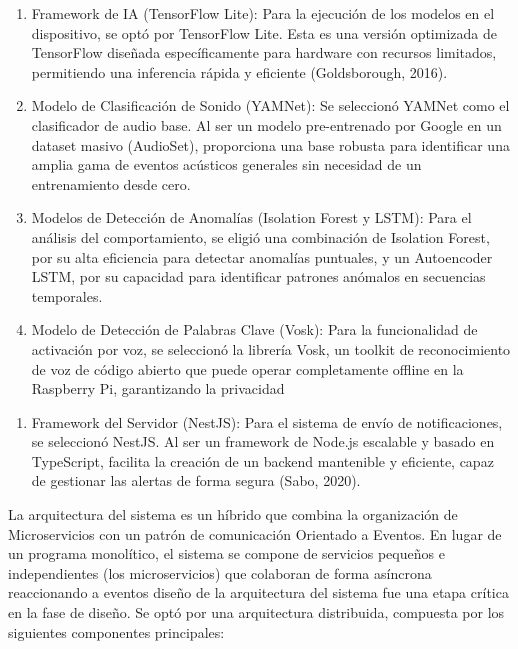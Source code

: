 
\begin{enumerate}
      \item Framework de IA (TensorFlow Lite): Para la ejecución de los modelos en el dispositivo, se optó por TensorFlow Lite. Esta es una versión optimizada de TensorFlow diseñada específicamente para hardware con recursos limitados, permitiendo una inferencia rápida y eficiente (Goldsborough, 2016).
      \item Modelo de Clasificación de Sonido (YAMNet): Se seleccionó YAMNet como el clasificador de audio base. Al ser un modelo pre-entrenado por Google en un dataset masivo (AudioSet), proporciona una base robusta para identificar una amplia gama de eventos acústicos generales sin necesidad de un entrenamiento desde cero.
      \item Modelos de Detección de Anomalías (Isolation Forest y LSTM): Para el análisis del comportamiento, se eligió una combinación de Isolation Forest, por su alta eficiencia para detectar anomalías puntuales, y un Autoencoder LSTM, por su capacidad para identificar patrones anómalos en secuencias temporales.
      \item Modelo de Detección de Palabras Clave (Vosk): Para la funcionalidad de activación por voz, se seleccionó la librería Vosk, un toolkit de reconocimiento de voz de código abierto que puede operar completamente offline en la Raspberry Pi, garantizando la privacidad
\end{enumerate}

\begin{enumerate}
      \item Framework del Servidor (NestJS): Para el sistema de envío de notificaciones, se seleccionó NestJS. Al ser un framework de Node.js escalable y basado en TypeScript, facilita la creación de un backend mantenible y eficiente, capaz de gestionar las alertas de forma segura (Sabo, 2020).
\end{enumerate}



La arquitectura del sistema es un híbrido que combina la organización de Microservicios con un patrón de comunicación Orientado a Eventos. En lugar de un programa monolítico, el sistema se compone de servicios pequeños e independientes (los microservicios) que colaboran de forma asíncrona reaccionando a eventos diseño de la arquitectura del sistema fue una etapa crítica en la fase de diseño. Se optó por una arquitectura distribuida, compuesta por los siguientes componentes principales:

